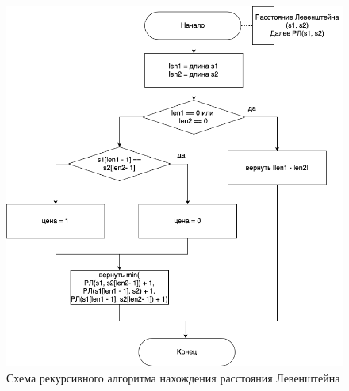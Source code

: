 \documentclass[a4paper,14pt, unknownkeysallowed]{extreport}
\begin{document}
\begin{figure}[h]
	\centering
	\includegraphics[scale=0.6]{img/lev_recursion_scheme.png}
	\caption{Схема рекурсивного алгоритма нахождения расстояния Левенштейна}
	\label{fig:L_rec}
\end{figure}

\clearpage
\end{document}
